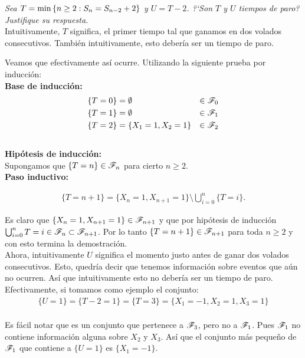 \emph
{
	Sea $T=\min\left\{ n\geq 2:S_n=S_{n-2} + 2\right\} $ y $U=T-2$. ?`Son $T$ y $U$ 
	tiempos de paro? Justifique su respuesta.\\
}
\afterstatement
	Intuitivamente, $T$ significa, el primer tiempo tal que ganamos en dos volados consecutivos.
	También intuitivamente, esto debería ser un tiempo de paro.
	
	Veamos que efectivamente así ocurre. Utilizando la siguiente prueba por inducción:\\
	
	\textbf{Base de inducción:}		
		\begin{align}
			\{T = 0\} 		&= \emptyset  				& 	\in \mathscr{F}_0 \\
			\{T = 1\} 		&= \emptyset  				& 	\in \mathscr{F}_1 \\
			\{T = 2\} 		&= \{ X_1 = 1, X_2 = 1\} 	&	\in \mathscr{F}_2
		\end{align}	\\					
	
	\textbf{Hipótesis de inducción:}\\
	
		Supongamos que $\{T = n\} \in \mathscr{F}_n$ para cierto $n \geq 2$.\\
		
	\textbf{Paso inductivo:}
		
		\begin{align}
			\{T = n + 1 \} = \{ X_n = 1, X_{n+1} = 1\} \setminus \bigcup_{i=0}^{n} \{T = i\}.
		\end{align}				
	
		Es claro que $\{ X_n = 1, X_{n+1} = 1\} \in \mathscr{F}_{n + 1}$ y que por hipótesis de inducción
		$\bigcup_{i=0}^{n} {T = i} \in \mathscr{F}_n \subset \mathscr{F}_{n + 1}$. Por lo tanto
		$\{T = n + 1 \} \in \mathscr{F}_{n+1}$ para toda $n \geq 2$ y con esto termina la demostración.\\
		
	Ahora, intuitivamente $U$ significa el momento justo antes de ganar dos volados consecutivos.
	Esto, quedría decir que tenemos información sobre eventos que aún no ocurren. Así que intuitivamente
	esto no debería ser un tiempo de paro.\\
	
	Efectivamente, si tomamos como ejemplo el conjunto: 
		\begin{align}
			\{ U = 1 \} = \{ T - 2 = 1\} = \{ T = 3\} = \{X_1 = -1, X_2 = 1, X_3 = 1\}
		\end{align}		\\
			
	Es fácil notar que es un conjunto que pertenece a $\mathscr{F}_3$, pero no a $\mathscr{F}_1$. Pues $\mathscr{F}_1$
	no contiene información alguna sobre $X_2$ y $X_3$. Así que el conjunto más pequeño de $\mathscr{F}_1$ 
	que contiene a $\{ U = 1 \}$ es $\{ X_1 = -1 \}$.\\
